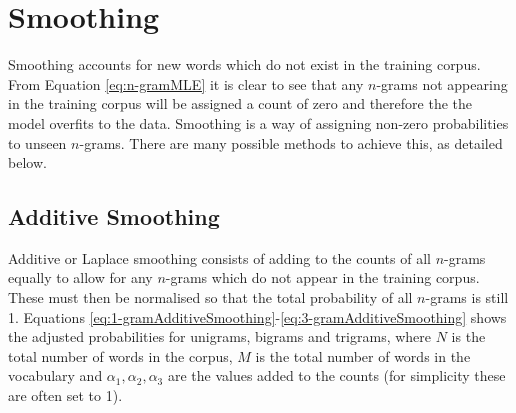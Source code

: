 


%


\section{Smoothing} \label{sec:smoothing}

Smoothing accounts for new words which do not exist in the training corpus. From Equation \ref{eq:n-gramMLE} it is clear to see that any $n$-grams not appearing in the training corpus will be assigned a count of zero and therefore the the model overfits to the data. Smoothing is a way of assigning non-zero probabilities to unseen $n$-grams. There are many possible methods to achieve this, as detailed below.

\subsection{Additive Smoothing} \label{sec:additiveSmoothing}

Additive or Laplace smoothing consists of adding to the counts of all $n$-grams equally to allow for any $n$-grams which do not appear in the training corpus. These must then be normalised so that the total probability of all $n$-grams is still 1. Equations \ref{eq:1-gramAdditiveSmoothing}-\ref{eq:3-gramAdditiveSmoothing} shows the adjusted probabilities for unigrams, bigrams and trigrams, where $N$ is the total number of words in the corpus, $M$ is the total number of words in the vocabulary and $\alpha_{1}, \alpha_{2}, \alpha_{3}$ are the values added to the counts (for simplicity these are often set to 1).

